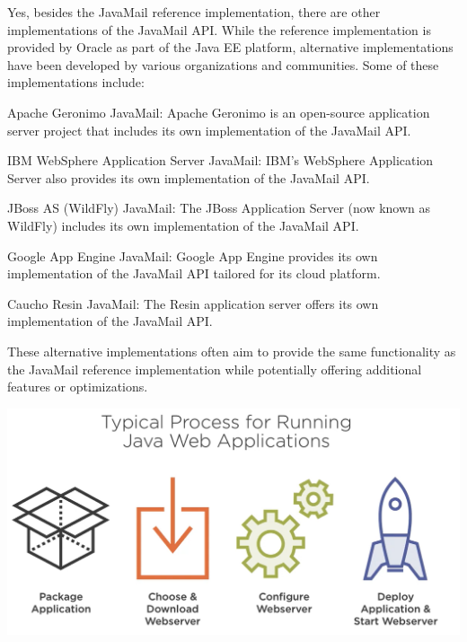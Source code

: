 Yes, besides the JavaMail reference implementation, there are other implementations of the JavaMail API. While the reference implementation is provided by Oracle as part of the Java EE platform, alternative implementations have been developed by various organizations and communities. Some of these implementations include:

Apache Geronimo JavaMail: Apache Geronimo is an open-source application server project that includes its own implementation of the JavaMail API.

IBM WebSphere Application Server JavaMail: IBM's WebSphere Application Server also provides its own implementation of the JavaMail API.

JBoss AS (WildFly) JavaMail: The JBoss Application Server (now known as WildFly) includes its own implementation of the JavaMail API.

Google App Engine JavaMail: Google App Engine provides its own implementation of the JavaMail API tailored for its cloud platform.

Caucho Resin JavaMail: The Resin application server offers its own implementation of the JavaMail API.

These alternative implementations often aim to provide the same functionality as the JavaMail reference implementation while potentially offering additional features or optimizations.  


\includegraphics[width=\textwidth]{./images/chapter1/before_spring_boot.png} 

